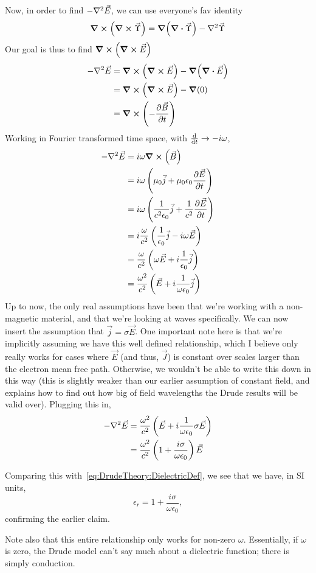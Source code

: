 \documentclass[../main.tex]{subfiles}
\begin{document}
	Now, in order to find $-\laplacian{\vec{E}}$, we can use everyone's fav identity
	\begin{equation}
		\curl(\curl{\vec{\Upsilon}}) = \grad(\div{\vec{\Upsilon}}) - \laplacian{\vec{\Upsilon}}
	\end{equation}
	Our goal is thus to find $\curl(\curl{\vec{E}})$
	\begin{align}
		- \laplacian{\vec{E}} &= \curl(\curl{\vec{E}}) - \grad(\div{\vec{E}}) \\
		&= \curl(\curl{\vec{E}}) - \grad(0) \\
		&= \curl(- \pdv{\vec{B}}{t})
	\end{align}
	Working in Fourier transformed time space, with $\dv{}{t} \rightarrow -i \omega$,
	\begin{align}
		- \laplacian{\vec{E}} &= i\omega \curl(\vec{B}) \\
		&= i \omega \left(\mu_0 \vec{j} + \mu_0 \epsilon_0 \pdv{\vec{E}}{t} \right) \\
		&= i \omega \left(\frac{1}{c^2 \epsilon_0} \vec{j} + \frac{1}{c^2} \pdv{\vec{E}}{t} \right) \\
		&= i \frac{\omega}{c^2} \left(\frac{1}{\epsilon_0} \vec{j} - i\omega \vec{E} \right) \\
		&= \frac{\omega}{c^2} \left(\omega \vec{E} + i \frac{1}{\epsilon_0} \vec{j} \right) \\
		&= \frac{\omega^2}{c^2} \left(\vec{E} + i \frac{1}{\omega \epsilon_0} \vec{j} \right)
	\end{align}
	Up to now, the only real assumptions have been that we're working with a non-magnetic material, and that we're looking at waves specifically.
	We can now insert the assumption that $\vec{j} = \sigma \vec{E}$.
	One important note here is that we're implicitly assuming we have this well defined relationship, which I believe only really works for cases where $\vec{E}$ (and thus, $\vec{J}$) is constant over scales larger than the electron mean free path.
	Otherwise, we wouldn't be able to write this down in this way (this is slightly weaker than our earlier assumption of constant field, and explains how to find out how big of field wavelengths the Drude results will be valid over).
	Plugging this in,
	\begin{align}
		- \laplacian{\vec{E}} &= \frac{\omega^2}{c^2} \left(\vec{E} + i \frac{1}{\omega \epsilon_0} \sigma \vec{E} \right) \\
		&= \frac{\omega^2}{c^2} \left(1+ \frac{i \sigma}{\omega \epsilon_0} \right) \vec{E}
	\end{align}

	Comparing this with~\eqref{eq:DrudeTheory:DielectricDef}, we see that we have, in SI units,
	\begin{equation}
		\epsilon_r = 1 + \frac{i \sigma}{\omega \epsilon_0},
	\end{equation}
	confirming the earlier claim.

	Note also that this entire relationship only works for non-zero $\omega$.
	Essentially, if $\omega$ is zero, the Drude model can't say much about a dielectric function;
	there is simply conduction.
\end{document}
